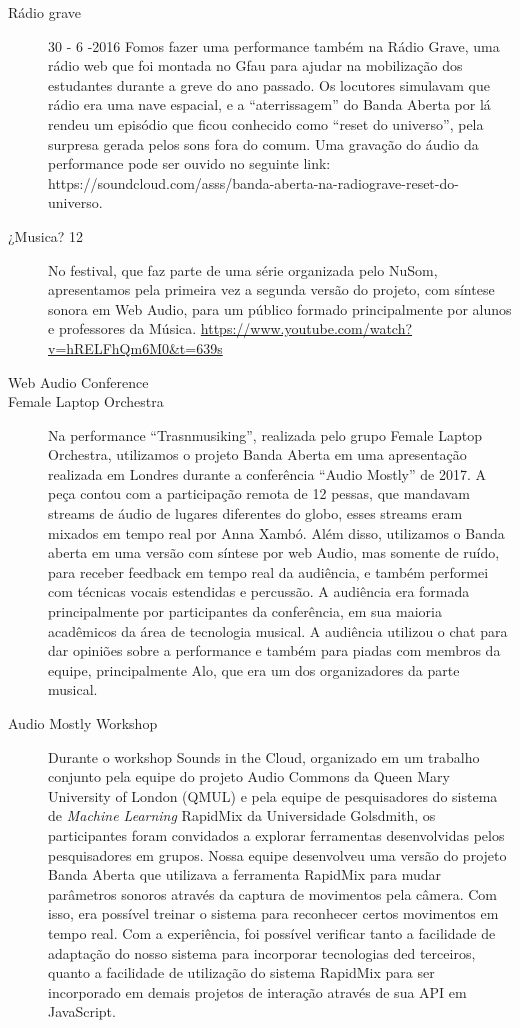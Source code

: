 \begin{description}
\item[Rádio grave] 30 - 6 -2016
Fomos fazer uma performance também na Rádio Grave, uma rádio web que foi montada no Gfau para ajudar na mobilização dos  estudantes durante a greve do ano passado. Os locutores simulavam que rádio era uma nave espacial, e a ``aterrissagem'' do Banda Aberta por lá rendeu um episódio que ficou conhecido como ``reset do universo'', pela surpresa gerada pelos sons fora do comum. Uma gravação do áudio da performance pode ser ouvido no seguinte link: https://soundcloud.com/asss/banda-aberta-na-radiograve-reset-do-universo.


\item[¿Musica? 12]
No festival, que faz parte de uma série organizada pelo NuSom, apresentamos pela primeira vez a segunda versão do projeto, com síntese sonora em Web Audio, para um público formado principalmente por alunos e professores da Música. 
\url{https://www.youtube.com/watch?v=hRELFhQm6M0&t=639s}


\item[Web Audio Conference] 


\item[Female Laptop Orchestra]
Na performance ``Trasnmusiking'', realizada pelo grupo Female Laptop Orchestra, utilizamos o projeto Banda Aberta em uma apresentação realizada em Londres durante a conferência ``Audio Mostly'' de 2017. A peça contou com a participação remota de 12 pessas, que mandavam streams de áudio de lugares diferentes do globo, esses streams eram mixados em tempo real por Anna Xambó. Além disso, utilizamos o Banda aberta em uma versão com síntese por web Audio, mas somente de ruído, para receber feedback em tempo real da audiência, e também performei com técnicas vocais estendidas e percussão. A audiência era formada principalmente por participantes da conferência, em sua maioria acadêmicos da área de tecnologia musical. A audiência utilizou o chat para dar opiniões sobre a performance e também para piadas com membros da equipe, principalmente Alo, que era um dos organizadores da parte musical.


\item[Audio Mostly Workshop]
Durante o workshop Sounds in the Cloud, organizado em um trabalho conjunto pela equipe do projeto Audio Commons da Queen Mary University of London (QMUL) e pela equipe de pesquisadores do sistema de \emph{Machine Learning} RapidMix da Universidade Golsdmith, os participantes foram convidados a explorar ferramentas desenvolvidas pelos pesquisadores em grupos. Nossa equipe desenvolveu uma versão do projeto Banda Aberta que utilizava a ferramenta RapidMix para mudar parâmetros sonoros através da captura de movimentos pela câmera. Com isso, era possível treinar o sistema para reconhecer certos movimentos em tempo real. Com a experiência, foi possível verificar tanto a facilidade de adaptação do nosso sistema para incorporar tecnologias ded terceiros, quanto a facilidade de utilização do sistema RapidMix para ser incorporado em demais projetos de interação através de sua API em JavaScript.


\end{description}
